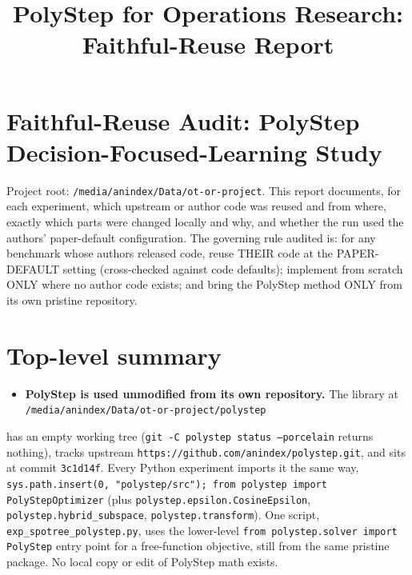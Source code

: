 \documentclass[10pt]{article}
\title{\textbf{PolyStep for Operations Research: Faithful-Reuse Report}}
\author{}\date{}
\begin{document}
\maketitle\vspace{-2em}

\section*{Faithful-Reuse Audit: PolyStep Decision-Focused-Learning Study}

Project root: \texttt{/media/anindex/Data/ot-or-project}. This report documents, for each experiment, which upstream or
author code was reused and from where, exactly which parts were changed locally and why, and whether the run used
the authors' paper-default configuration. The governing rule audited is: for any benchmark whose authors released
code, reuse THEIR code at the PAPER-DEFAULT setting (cross-checked against code defaults); implement from scratch
ONLY where no author code exists; and bring the PolyStep method ONLY from its own pristine repository.

\section*{Top-level summary}

\begin{itemize}\setlength{\itemsep}{2pt}
\item \textbf{PolyStep is used unmodified from its own repository.} The library at \texttt{/media/anindex/Data/ot-or-project/polystep}
\end{itemize}
  has an empty working tree (\texttt{git -C polystep status --porcelain} returns nothing), tracks upstream
  \texttt{https://github.com/anindex/polystep.git}, and sits at commit \texttt{3c1d14f}. Every Python experiment imports it the
  same way, \texttt{sys.path.insert(0, "polystep/src"); from polystep import PolyStepOptimizer} (plus
  \texttt{polystep.epsilon.CosineEpsilon}, \texttt{polystep.hybrid\_subspace}, \texttt{polystep.transform}). One script,
  \texttt{exp\_spotree\_polystep.py}, uses the lower-level \texttt{from polystep.solver import PolyStep} entry point for a
  free-function objective, still from the same pristine package. No local copy or edit of PolyStep math exists.
\end{document}
